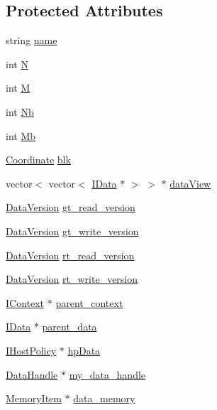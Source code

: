 \subsection*{Protected Attributes}
\begin{DoxyCompactItemize}
\item 
string \hyperlink{class_i_data_a66ed7cf77dc3382dfd6fcd81dc18e8df}{name}
\item 
int \hyperlink{class_i_data_ae61dc22b2bb9c233eb93d891af16d220}{N}
\item 
int \hyperlink{class_i_data_aebf70e773a06212897c33d7512f9d344}{M}
\item 
int \hyperlink{class_i_data_a170ac177a6048467713780cd3605e88e}{Nb}
\item 
int \hyperlink{class_i_data_a68696027e7617a3480fd0ae0a70df7fc}{Mb}
\item 
\hyperlink{class_coordinate}{Coordinate} \hyperlink{class_i_data_a79e707470ffc0e3cb3b7a64a2ed3c6d3}{blk}
\item 
vector$<$ vector$<$ \hyperlink{class_i_data}{IData} $\ast$ $>$ $>$ $\ast$ \hyperlink{class_i_data_a952b0193f67329eccb52f4f6552a8b38}{dataView}
\item 
\hyperlink{struct_data_version}{DataVersion} \hyperlink{class_i_data_a6c41904f79abd83d922d00557a56d151}{gt\_\-read\_\-version}
\item 
\hyperlink{struct_data_version}{DataVersion} \hyperlink{class_i_data_a61d3d27cb7379fc3b1666a11b39dda2d}{gt\_\-write\_\-version}
\item 
\hyperlink{struct_data_version}{DataVersion} \hyperlink{class_i_data_a62fa408732cc79c91cc5af22ff52f5bd}{rt\_\-read\_\-version}
\item 
\hyperlink{struct_data_version}{DataVersion} \hyperlink{class_i_data_a633fad3f15a6898694a85dd74c94d89a}{rt\_\-write\_\-version}
\item 
\hyperlink{class_i_context}{IContext} $\ast$ \hyperlink{class_i_data_a5ecc5b90d72d8b3d8a4a1af9de9fb71c}{parent\_\-context}
\item 
\hyperlink{class_i_data}{IData} $\ast$ \hyperlink{class_i_data_a4815f73848733b3ff225821b3d7431ea}{parent\_\-data}
\item 
\hyperlink{class_i_host_policy}{IHostPolicy} $\ast$ \hyperlink{class_i_data_a4c5003567bfc7b0e63f10b693858fa5c}{hpData}
\item 
\hyperlink{struct_data_handle}{DataHandle} $\ast$ \hyperlink{class_i_data_abd6a79717af4efae6236df2bf35f11a7}{my\_\-data\_\-handle}
\item 
\hyperlink{struct_memory_item}{MemoryItem} $\ast$ \hyperlink{class_i_data_aabd7b42672ec3479c2e6a77fac395789}{data\_\-memory}

\end{DoxyCompactItemize}
